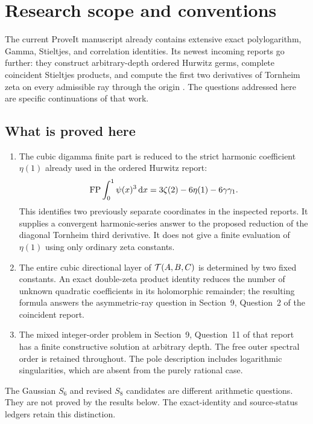 \section{Research scope and conventions}
\label{sec:scope}

The current ProveIt manuscript already contains extensive exact
polylogarithm, Gamma, Stieltjes, and correlation identities. Its newest
incoming reports go further: they construct arbitrary-depth ordered
Hurwitz germs, complete coincident Stieltjes products, and compute the
first two derivatives of Tornheim zeta on every admissible ray through
the origin \cite{Repo,IncomingOrdered,IncomingCoincident}. The questions
addressed here are specific continuations of that work.

\subsection{What is proved here}

\begin{enumerate}
\item The cubic digamma finite part is reduced to the strict harmonic
coefficient $\eta(1)$ already used in the ordered Hurwitz report:
\[
 \operatorname{FP}\int_0^1\psi(x)^3\,\mathrm d x
       =3\zeta(2)-6\eta(1)-6\gamma\gamma_1.
\]
This identifies two previously separate coordinates in the inspected
reports. It supplies a convergent harmonic-series answer to the proposed
reduction of the diagonal Tornheim third derivative. It does not give a
finite evaluation of $\eta(1)$ using only ordinary zeta constants.
\item The entire cubic directional layer of $\mathcal T(A,B,C)$ is determined
by two fixed constants. An exact double-zeta product identity reduces
the number of unknown quadratic coefficients in its holomorphic
remainder; the resulting formula answers the asymmetric-ray question
in Section~9, Question~2 of the coincident report.
\item The mixed integer-order problem in Section~9, Question~11 of
that report has a finite constructive solution at arbitrary depth.
The free outer spectral order is retained throughout. The pole
description includes logarithmic singularities, which are absent
from the purely rational case.
\end{enumerate}

The Gaussian $S_6$ and revised $S_8$ candidates are different arithmetic
questions. They are not proved by the results below. The exact-identity
and source-status ledgers retain this distinction.

